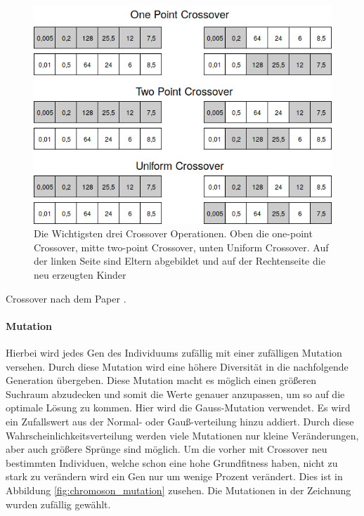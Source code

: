 \begin{figure}[H]
  \centering  
  \includegraphics[scale=0.5]{img/crossover_gene.png}
  \caption{Die Wichtigsten drei Crossover Operationen. Oben die one-point Crossover, mitte two-point Crossover, unten Uniform Crossover. Auf der linken Seite sind Eltern abgebildet und auf der Rechtenseite die neu erzeugten Kinder}
  \label{fig:chromoson_crossover}
\end{figure}

Crossover nach dem Paper \cite{Umbarkar2015}.




\paragraph{Mutation} Hierbei wird jedes Gen des Individuums zufällig mit einer zufälligen Mutation versehen. Durch diese Mutation wird eine höhere Diversität in die nachfolgende Generation übergeben. Diese Mutation macht es möglich einen größeren Suchraum abzudecken und somit die Werte genauer anzupassen, um so auf die optimale Lösung zu kommen. Hier wird die Gauss-Mutation verwendet. Es wird ein Zufallswert aus der Normal- oder Gauß-verteilung hinzu addiert. Durch diese Wahrscheinlichkeitsverteilung werden viele Mutationen nur kleine Veränderungen, aber auch größere Sprünge sind möglich. Um die vorher mit Crossover neu bestimmten Individuen, welche schon eine hohe Grundfitness haben, nicht zu stark zu verändern wird ein Gen nur um wenige Prozent verändert. Dies ist in Abbildung \ref{fig:chromoson_mutation} zusehen. Die Mutationen in der Zeichnung wurden zufällig gewählt. 

